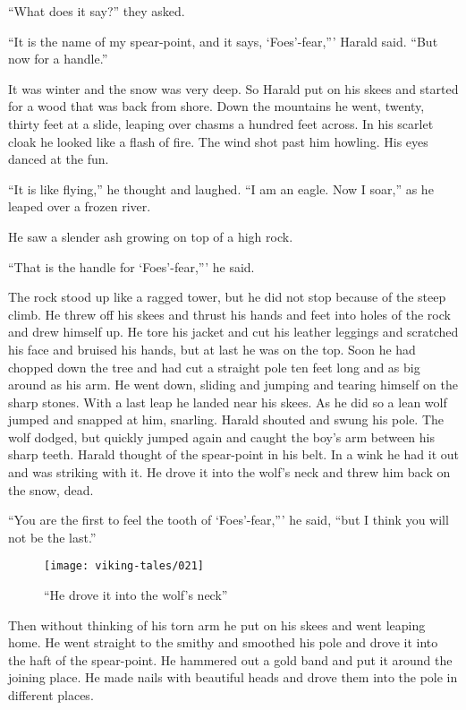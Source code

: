 ``What does it say?'' they asked.

``It is the name of my spear-point, and it says, `Foes'-fear,''' Harald
said. ``But now for a handle.''

It was winter and the snow was very deep. So Harald put on his skees and
started for a wood that was back from shore. Down the mountains he went,
twenty, thirty feet at a slide, leaping over chasms a hundred feet
across. In his scarlet cloak he looked like a flash of fire. The wind
shot past him howling. His eyes danced at the fun.

``It is like flying,'' he thought and laughed. ``I am an eagle. Now I
soar,'' as he leaped over a frozen river.

He saw a slender ash growing on top of a high rock.

``That is the handle for `Foes'-fear,''' he said.

The rock stood up like a ragged tower, but he did not stop because of
the steep climb. He threw off his skees and thrust his hands and feet
into holes of the rock and drew himself up. He tore his jacket and cut
his leather leggings and scratched his face and bruised his hands, but
at last he was on the top. Soon he had chopped down the tree and had cut
a straight pole ten feet long and as big around as his arm. He went
down, sliding and jumping and tearing himself on the sharp stones. With
a last leap he landed near his skees. As he did so a lean wolf jumped
and snapped at him, snarling. Harald shouted and swung his pole. The
wolf dodged, but quickly jumped again and caught the boy's arm between
his sharp teeth. Harald thought of the spear-point in his belt. In a
wink he had it out and was striking with it. He drove it into the wolf's
neck and threw him back on the snow, dead.

``You are the first to feel the tooth of `Foes'-fear,''' he said, ``but
I think you will not be the last.''

\begin{figure}
    \centering
    \texttt{[image: viking-tales/021]}
    \caption{``He drove it into the wolf's neck''}
\end{figure}

Then without thinking of his torn arm he put on his skees and went
leaping home. He went straight to the smithy and smoothed his pole and
drove it into the haft of the spear-point. He hammered out a gold band
and put it around the joining place. He made nails with beautiful heads
and drove them into the pole in different places.

